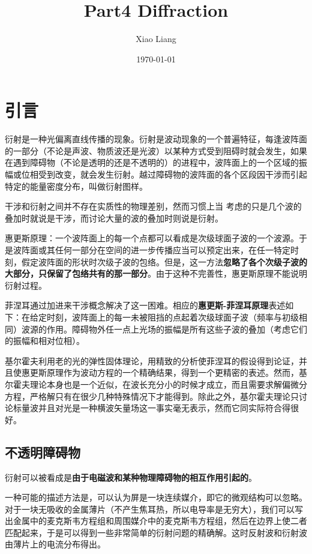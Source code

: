 \documentclass[UTF8]{ctexart}
\title{Part4 Diffraction}
\author{Xiao Liang}
\date{\today}
\begin{document}
	\maketitle
	\tableofcontents
	
	\section{引言}
	衍射是一种光偏离直线传播的现象。衍射是波动现象的一个普遍特征，每逢波阵面的一部分（不论是声波、物质波还是光波）以某种方式受到阻碍时就会发生，如果在遇到障碍物（不论是透明的还是不透明的）的进程中，波阵面上的一个区域的振幅或位相受到改变，就会发生衍射。越过障碍物的波阵面的各个区段因干涉而引起特定的能量密度分布，叫做衍射图样。
	
	干涉和衍射之间并不存在实质性的物理差别，然而习惯上当 考虑的只是几个波的叠加时就说是干涉，而讨论大量的波的叠加时则说是衍射。
	
	惠更斯原理：一个波阵面上的每一个点都可以看成是次级球面子波的一个波源。于是波阵面或其任何一部分在空间的进一步传播应当可以预定出来，在任一特定时刻，假定波阵面的形状时次级子波的包络。但是，这一方法\textbf{忽略了各个次级子波的大部分，只保留了包络共有的那一部分}。由于这种不完善性，惠更斯原理不能说明衍射过程。
	
	菲涅耳通过加进来干涉概念解决了这一困难。相应的\textbf{惠更斯-菲涅耳原理}表述如下：在给定时刻，波阵面上的每一未被阻挡的点起着次级球面子波（频率与初级相同）波源的作用。障碍物外任一点上光场的振幅是所有这些子波的叠加（考虑它们的振幅和相对位相）。
	
	基尔霍夫利用老的光的弹性固体理论，用精致的分析使菲涅耳的假设得到论证，并且使惠更斯原理作为波动方程的一个精确结果，得到一个更精密的表述。然而，基尔霍夫理论本身也是一个近似，在波长充分小的时候才成立，而且需要求解偏微分方程，严格解只有在很少几种特殊情况下才能得到。除此之外，基尔霍夫理论只讨论标量波并且对光是一种横波矢量场这一事实毫无表示，然而它同实际符合得很好。
	
	\subsection{不透明障碍物}
	衍射可以被看成是\textbf{由于电磁波和某种物理障碍物的相互作用引起的}。
	
	一种可能的描述方法是，可以认为屏是一块连续媒介，即它的微观结构可以忽略。对于一块无吸收的金属薄片（不产生焦耳热，所以电导率是无穷大），我们可以写出金属中的麦克斯韦方程组和周围媒介中的麦克斯韦方程组，然后在边界上使二者匹配起来，于是可以得到一些非常简单的衍射问题的精确解。这时反射波和衍射波由薄片上的电流分布得出。
	
\end{document}
